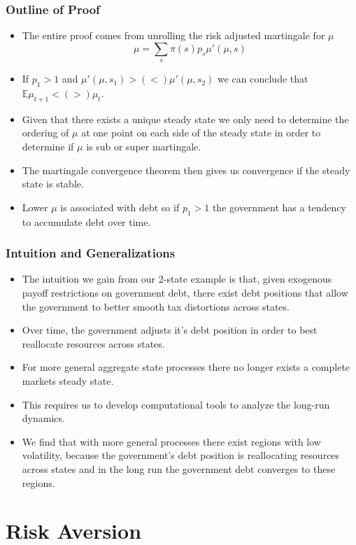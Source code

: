 \documentclass{beamer}
\newcommand{\EE}{\mathbb E}
\begin{document}
 
 \begin{frame}
  \frametitle{Outline of Proof}
  \begin{itemize}
	\item  The entire proof comes from unrolling the risk adjusted martingale for $\mu$
	\[ 
			\mu = \sum_s \pi(s) p_s \mu'(\mu,s)
	\]
	\item  If $p_1 >1$ and $\mu'(\mu,s_1) > (<) \mu'(\mu,s_2)$ we can conclude that $\EE\mu_{t+1} < (>)\mu_t$.
	\item  Given that there exists a unique steady state we only need to determine the ordering of $\mu$ at one point on each side of the steady state in order to determine if $\mu$ is sub or super martingale.
	\item The martingale convergence theorem then gives us convergence if the steady state is stable.
	\item  Lower $\mu$ is associated with debt so if $p_1 > 1$ the government has a tendency to accumulate debt over time.
\end{itemize}
 \end{frame}

\begin{frame}
	\frametitle{Intuition and Generalizations}
	\begin{itemize}
		\item The intuition we gain from our 2-state example is that, given exogenous payoff restrictions on government debt, there exist debt positions that allow the government to better smooth tax distortions across states.
		\item  Over time, the government adjusts it's debt position in order to best reallocate resources across states.
		\item  For more general aggregate state processes there no longer exists a complete markets steady state.
		\item  This requires us to develop computational tools to analyze the long-run dynamics.
		\item  We find that with more general processes there exist regions with low volatility, because the government's debt position is reallocating resources across states and in the long run the government debt converges to these regions.
	\end{itemize}
\end{frame}

\section{Risk Aversion}
\end{document}
